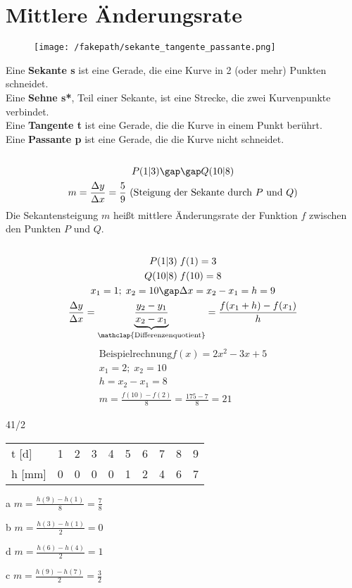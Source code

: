 \section{Mittlere Änderungsrate}
\begin{figure}[H]
  \centering
  \texttt{[image: /fakepath/sekante\_tangente\_passante.png]}
\end{figure}
Eine \textbf{Sekante s} ist eine Gerade, die eine Kurve in 2 (oder mehr) Punkten schneidet. \\
Eine \textbf{Sehne s*}, Teil einer Sekante, ist eine Strecke, die zwei Kurvenpunkte verbindet. \\
Eine \textbf{Tangente t} ist eine Gerade, die die Kurve in einem Punkt berührt. \\
Eine \textbf{Passante p} ist eine Gerade, die die Kurve nicht schneidet. \\\\
\begin{gather*}
  P(1|3) \gap\gap Q(10|8) \\
  m = \frac{\Delta y}{\Delta x} = \frac{5}{9} \text{ (Steigung der Sekante durch $P$ und $Q$)}
\end{gather*}
Die Sekantensteigung $m$ heißt mittlere Änderungsrate der Funktion $f$ zwischen den Punkten $P$ und $Q$. \\\\
\begin{gather*}
  P(1|3)\;f(1) = 3 \\
  Q(10|8)\;f(10) = 8 \\
  x_1 = 1;\;x_2 = 10\gap \Delta x = x_2 - x_1 = h = 9 \\
  \frac{\Delta y}{\Delta x} = \underbrace{\frac{y_2 - y_1}{x_2 - x_1}}_{\mathclap{{\text{Differenzenquotient}}}} = \frac{f(x_1 + h) - f(x_1)}{h}
\end{gather*}
\begin{gather*}
  \text{Beispielrechnung}
  f(x) = 2x^2 - 3x + 5 \\
  x_1 = 2;\; x_2 = 10 \\
  h = x_2 - x_1 = 8 \\
  m = \frac{f(10) - f(2)}{8} = \frac{175 - 7}{8} = 21
\end{gather*}
\begin{exercise}{41/2}
  \begin{tabular}{l|lllllllll}
    t {[}d{]}  & 1 & 2 & 3 & 4 & 5 & 6 & 7 & 8 & 9 \\
    h {[}mm{]} & 0 & 0 & 0 & 0 & 1 & 2 & 4 & 6 & 7
  \end{tabular}
  \item [a] $m = \frac{h(9) - h(1)}{8} = \frac{7}{8}$
  \item [b] $m = \frac{h(3) - h(1)}{2} = 0$
  \item [d] $m = \frac{h(6) - h(4)}{2} = 1$
  \item [c] $m = \frac{h(9) - h(7)}{2} = \frac{3}{2}$
\end{exercise}
